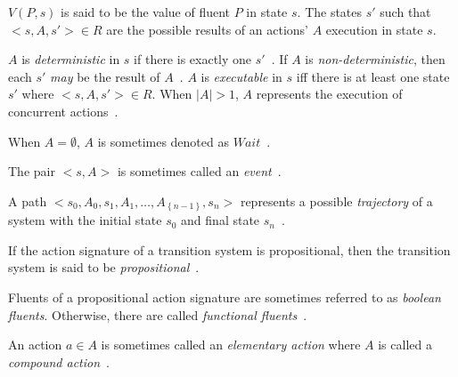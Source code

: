 $ V(P,s) $ is said to be the value of fluent $ P $ in state $ s $.
The states $ s' $ such that $ <s, A, s'> \in R $ are the possible results of an actions' $ A $ execution in state $ s $.

\begin{definition}
    \label{def:action_a_determinism}
    $ A $ is \textit{deterministic} in $ s $ if there is exactly one $ s' $~\citep{gelfond_action_1998}.
    If $ A $ is \textit{non-deterministic}, then each $ s' $ \textit{may} be the result of $ A $~\citep{blount_architecture_2013}.
    $ A $ is \textit{executable} in $ s $ iff there is at least one state $ s' $ where $ <s, A, s'> \in R $.
    When $ \left|A\right|>1 $, $A$ represents the execution of concurrent actions~\citep{gelfond_action_1998, blount_architecture_2013}.
\end{definition}

\begin{definition}
    \label{def:wait}
    When $A = \emptyset$, $A$ is sometimes denoted as $Wait$~\citep{gelfond_action_1998}.
\end{definition}

\begin{definition}
    \label{def:event}
    The pair $<s, A>$ is sometimes called an \textit{event}~\citep{gelfond_authorization_2008}.
\end{definition}

\begin{definition}
    \label{def:trajectory}
    A path $ <s_0, A_0, s_1, A_1, \dots, A_{\left\{n-1\right\}}, s_n> $ represents a possible \textit{trajectory} of a system with the initial state $ s_0 $ and final state $ s_n $~\citep{blount_architecture_2013}.
\end{definition}

\begin{definition}
    \label{def:propositional_transition_system}
    If the action signature of a transition system is propositional, then the transition system is said to be \textit{propositional}~\citep{gelfond_action_1998}.
\end{definition}

\begin{definition}
    Fluents of a propositional action signature are sometimes referred to as \textit{boolean fluents}.
    Otherwise, there are called \textit{functional fluents}~\citep{chintabathina_modeling_2004}.
\end{definition}

\begin{definition}
    An action $a \in A$ is sometimes called an \textit{elementary action} where $A$ is called a \textit{compound action}~\citep{gelfond_authorization_2008}.
\end{definition}

